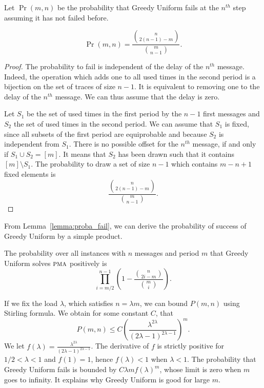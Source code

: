 \documentclass[a4paper,UKenglish,cleveref, autoref, thm-restate]{lipics-v2019}
\newcommand\pma{\textsc{pma}\xspace}
\begin{document}
Let $\Pr(m,n)$ be the probability that Greedy Uniform fails at the $n^{th}$ step assuming it has not failed before.

\begin{lemma}\label{lemma:proba_fail}
$$\Pr(m,n) = \frac{\binom{n}{2(n-1)-m}}{\binom{m}{n-1}}.$$
\end{lemma}
\begin{proof}
The probability to fail is independent of the delay of the $n^{th}$
message. Indeed,  the operation which adds one to all used times
in the second period  is a bijection on the set of traces of size $n-1$. It is equivalent to removing one to the delay of the $n^{th}$ message. We can thus assume that the delay is zero.

Let $S_1$ be the set of used times in the first period by the $n-1$ first messages
and $S_2$ the set of used times in the second period. We can assume that $S_1$ is fixed, since all subsets of the first period are equiprobable and because $S_2$ is independent from $S_1$. There is no possible offset for the $n^{th}$ message, if and only if $S_1 \cup S_2 = [m]$. It means that $S_2$ has been drawn such that it contains $[m] \setminus S_1$. 
The probability to draw a set of size $n-1$ which contains $m-n + 1$ fixed elements is 
 $$\frac{\binom{n}{2(n-1)-m}}{\binom{m}{n-1}}.$$
\end{proof}

From Lemma~\ref{lemma:proba_fail}, we can derive the probability 
of success of Greedy Uniform by a simple product. 

\begin{theorem}\label{theorem:uniform}
The probability over all instances with $n$ messages and period $m$ that Greedy Uniform solves $\pma$ positively is $$\displaystyle{\prod_{i=m/2}^{n-1}(1 - \frac{\binom{n}{2i-m}}{\binom{m}{i}})}.$$
\end{theorem}

If we fix the load $\lambda$, which satisfies $n = \lambda m$, we can bound 
$P(m,n)$ using Stirling formula. We obtain for some constant $C$, 
that $$P(m,n) \leq C \left(\frac{\lambda^{2\lambda}}{(2\lambda -1)^{2\lambda -1}}\right)^m.$$
We let $f(\lambda) = \frac{\lambda^{2\lambda}}{(2\lambda -1)^{2\lambda -1}}$.
The derivative of $f$ is strictly positive for $1/2 < \lambda < 1$ and $f(1) = 1$, hence 
$f(\lambda) < 1$ when $\lambda < 1$. The probability that Greedy Uniform fails is bounded 
by $C \lambda m f(\lambda)^m$, whose limit is zero when $m$ goes to infinity. 
It explains why Greedy Uniform is good for large $m$. 
\end{document}
